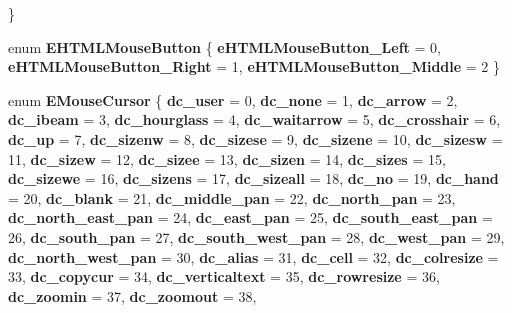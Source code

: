 \begin{DoxyCompactItemize}
 \}
\item 
\mbox{\label{namespace_valve_1_1_steamworks_a714b2f68b5016c6d75dfad12f0e0b15e}} 
enum {\bfseries E\+H\+T\+M\+L\+Mouse\+Button} \{ {\bfseries e\+H\+T\+M\+L\+Mouse\+Button\+\_\+\+Left} = 0, 
{\bfseries e\+H\+T\+M\+L\+Mouse\+Button\+\_\+\+Right} = 1, 
{\bfseries e\+H\+T\+M\+L\+Mouse\+Button\+\_\+\+Middle} = 2
 \}
\item 
\mbox{\label{namespace_valve_1_1_steamworks_adbc66e61d3df560d3ebf58fb76b2f0ca}} 
enum {\bfseries E\+Mouse\+Cursor} \{ \newline
{\bfseries dc\+\_\+user} = 0, 
{\bfseries dc\+\_\+none} = 1, 
{\bfseries dc\+\_\+arrow} = 2, 
{\bfseries dc\+\_\+ibeam} = 3, 
\newline
{\bfseries dc\+\_\+hourglass} = 4, 
{\bfseries dc\+\_\+waitarrow} = 5, 
{\bfseries dc\+\_\+crosshair} = 6, 
{\bfseries dc\+\_\+up} = 7, 
\newline
{\bfseries dc\+\_\+sizenw} = 8, 
{\bfseries dc\+\_\+sizese} = 9, 
{\bfseries dc\+\_\+sizene} = 10, 
{\bfseries dc\+\_\+sizesw} = 11, 
\newline
{\bfseries dc\+\_\+sizew} = 12, 
{\bfseries dc\+\_\+sizee} = 13, 
{\bfseries dc\+\_\+sizen} = 14, 
{\bfseries dc\+\_\+sizes} = 15, 
\newline
{\bfseries dc\+\_\+sizewe} = 16, 
{\bfseries dc\+\_\+sizens} = 17, 
{\bfseries dc\+\_\+sizeall} = 18, 
{\bfseries dc\+\_\+no} = 19, 
\newline
{\bfseries dc\+\_\+hand} = 20, 
{\bfseries dc\+\_\+blank} = 21, 
{\bfseries dc\+\_\+middle\+\_\+pan} = 22, 
{\bfseries dc\+\_\+north\+\_\+pan} = 23, 
\newline
{\bfseries dc\+\_\+north\+\_\+east\+\_\+pan} = 24, 
{\bfseries dc\+\_\+east\+\_\+pan} = 25, 
{\bfseries dc\+\_\+south\+\_\+east\+\_\+pan} = 26, 
{\bfseries dc\+\_\+south\+\_\+pan} = 27, 
\newline
{\bfseries dc\+\_\+south\+\_\+west\+\_\+pan} = 28, 
{\bfseries dc\+\_\+west\+\_\+pan} = 29, 
{\bfseries dc\+\_\+north\+\_\+west\+\_\+pan} = 30, 
{\bfseries dc\+\_\+alias} = 31, 
\newline
{\bfseries dc\+\_\+cell} = 32, 
{\bfseries dc\+\_\+colresize} = 33, 
{\bfseries dc\+\_\+copycur} = 34, 
{\bfseries dc\+\_\+verticaltext} = 35, 
\newline
{\bfseries dc\+\_\+rowresize} = 36, 
{\bfseries dc\+\_\+zoomin} = 37, 
{\bfseries dc\+\_\+zoomout} = 38, 

\end{DoxyCompactItemize}
